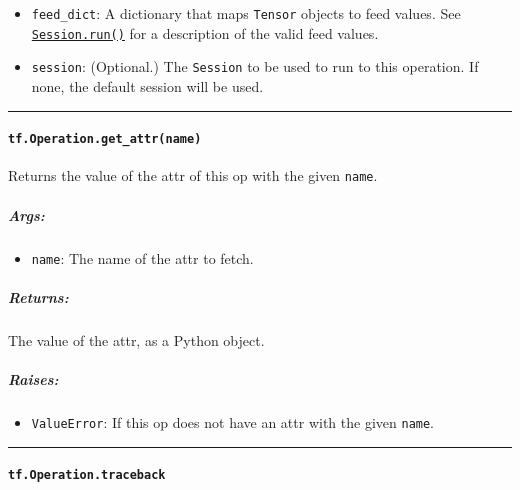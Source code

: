 \begin{itemize}
\tightlist
\item
  \lstinline{feed_dict}: A dictionary that maps \lstinline{Tensor} objects to
  feed values. See
  \href{../../api_docs/python/client.md\#Session.run}{\lstinline{Session.run()}}
  for a description of the valid feed values.
\item
  \lstinline{session}: (Optional.) The \lstinline{Session} to be used to run
  to this operation. If none, the default session will be used.
\end{itemize}

\begin{center}\rule{0.5\linewidth}{\linethickness}\end{center}

\paragraph{\texorpdfstring{\lstinline{tf.Operation.get_attr(name)}
}{tf.Operation.get_attr(name) }}\label{tf.operation.getux5fattrname}

Returns the value of the attr of this op with the given \lstinline{name}.

\subparagraph{Args: }\label{args-13}

\begin{itemize}
\tightlist
\item
  \lstinline{name}: The name of the attr to fetch.
\end{itemize}

\subparagraph{Returns: }\label{returns-16}

The value of the attr, as a Python object.

\subparagraph{Raises: }\label{raises-6}

\begin{itemize}
\tightlist
\item
  \lstinline{ValueError}: If this op does not have an attr with the given
  \lstinline{name}.
\end{itemize}

\begin{center}\rule{0.5\linewidth}{\linethickness}\end{center}

\paragraph{\texorpdfstring{\lstinline{tf.Operation.traceback}
}{tf.Operation.traceback }}\label{tf.operation.traceback}

